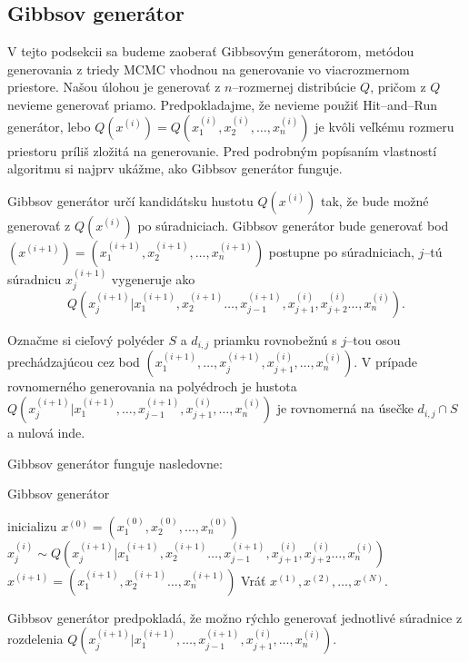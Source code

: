 \subsection{Gibbsov generátor}

V tejto podsekcii sa budeme zaoberať Gibbsovým generátorom, metódou generovania z triedy MCMC vhodnou na generovanie vo viacrozmernom priestore.
Našou úlohou je generovať z $n$--rozmernej distribúcie $Q$, pričom z $Q$ nevieme generovať priamo. Predpokladajme, že nevieme použiť Hit--and--Run generátor, lebo $Q(x^{(i)})=Q(x^{(i)}_1, x^{(i)}_2, \dots, x^{(i)}_n)$ je kvôli veľkému rozmeru priestoru príliš zložitá na generovanie. Pred podrobným popísaním vlastností algoritmu si najprv ukážme, ako Gibbsov generátor funguje.

Gibbsov generátor určí kandidátsku hustotu $Q(x^{(i)})$ tak, že bude možné generovať z $Q(x^{(i)})$ po súradniciach.
Gibbsov generátor bude generovať bod $(x^{(i+1)})=(x^{(i+1)}_1, x^{(i+1)}_2, \dots, x^{(i+1)}_n)$ postupne po súradniciach, $j$--tú súradnicu $x^{(i+1)}_j$ vygeneruje ako $$Q(x^{(i+1)}_j | x^{(i+1)}_1, x^{(i+1)}_2 \dots, x^{(i+1)}_{j-1}, x^{(i)}_{j+1}, x^{(i)}_{j+2} \dots, x^{(i)}_n).$$

Označme si cieľový polyéder $S$ a $d_{i,j}$ priamku rovnobežnú s $j$--tou osou prechádzajúcou cez bod $(x^{(i+1)}_1, \dots, x^{(i+1)}_{j}, x^{(i)}_{j+1}, \dots, x^{(i)}_n)$.
V prípade rovnomerného generovania na polyédroch je hustota $Q(x^{(i+1)}_j | x^{(i+1)}_1, \dots, x^{(i+1)}_{j-1}, x^{(i)}_{j+1}, \dots, x^{(i)}_n)$ je rovnomerná na úsečke $d_{i,j} \cap S$ a nulová inde.

Gibbsov generátor funguje nasledovne:

\begin{algorithm}[H]
	\caption{Gibbsov generátor \cite{mcmc_intro_mackay}}
	\label{gibbs}
	\begin{algorithmic}[1]
		\State inicializu $x^{(0)} = (x^{(0)}_1, x^{(0)}_2, \dots, x^{(0)}_n)$
				\State $x^{(i)}_j \sim Q(x^{(i+1)}_j | x^{(i+1)}_1, x^{(i+1)}_2 \dots, x^{(i+1)}_{j-1}, x^{(i)}_{j+1}, x^{(i)}_{j+2} \dots, x^{(i)}_n)$
			\EndFor
			\State $x^{(i+1)}= (x^{(i+1)}_1, x^{(i+1)}_2 \dots, x^{(i+1)}_n)$
		\EndFor
		\State Vráť ${x^{(1)},x^{(2)},\dots,x^{(N)}}$.
	\end{algorithmic}
\end{algorithm}

Gibbsov generátor predpokladá, že možno rýchlo generovať jednotlivé súradnice z rozdelenia $Q(x^{(i+1)}_j | x^{(i+1)}_1, \dots, x^{(i+1)}_{j-1}, x^{(i)}_{j+1}, \dots, x^{(i)}_n)$.

